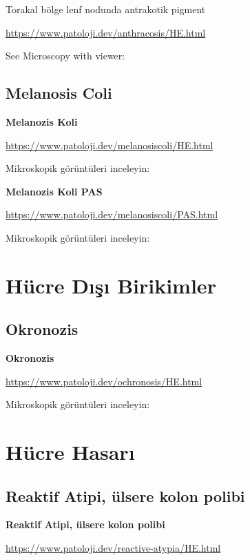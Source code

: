 \documentclass[
  letterpaper,
  DIV=11,
  numbers=noendperiod]{scrreprt}
\begin{document}
Torakal bölge lenf nodunda antrakotik pigment

\url{https://www.patoloji.dev/anthracosis/HE.html}

See Microscopy with viewer:

\hypertarget{melanosis-coli}{%
\section{Melanosis Coli}\label{melanosis-coli}}

\textbf{Melanozis Koli}

\url{https://www.patoloji.dev/melanosiscoli/HE.html}

Mikroskopik görüntüleri inceleyin:

\textbf{Melanozis Koli PAS}

\url{https://www.patoloji.dev/melanosiscoli/PAS.html}

Mikroskopik görüntüleri inceleyin:

\hypertarget{huxfccre-dux131ux15fux131-birikimler}{%
\chapter{Hücre Dışı
Birikimler}\label{huxfccre-dux131ux15fux131-birikimler}}

\hypertarget{okronozis}{%
\section{Okronozis}\label{okronozis}}

\textbf{Okronozis}

\url{https://www.patoloji.dev/ochronosis/HE.html}

Mikroskopik görüntüleri inceleyin:

\hypertarget{huxfccre-hasarux131}{%
\chapter{Hücre Hasarı}\label{huxfccre-hasarux131}}

\hypertarget{reaktif-atipi-uxfclsere-kolon-polibi}{%
\section{Reaktif Atipi, ülsere kolon
polibi}\label{reaktif-atipi-uxfclsere-kolon-polibi}}

\textbf{Reaktif Atipi, ülsere kolon polibi}

\url{https://www.patoloji.dev/reactive-atypia/HE.html}
\end{document}
